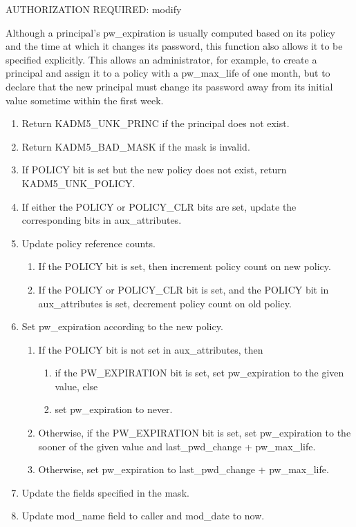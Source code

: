 AUTHORIZATION REQUIRED: modify

Although a principal's pw_expiration is usually computed based on its
policy and the time at which it changes its password, this function
also allows it to be specified explicitly.  This allows an
administrator, for example, to create a principal and assign it to a
policy with a pw_max_life of one month, but to declare that the new
principal must change its password away from its initial value
sometime within the first week.

\begin{enumerate}
\item Return KADM5_UNK_PRINC if the principal does not exist.
\item Return KADM5_BAD_MASK if the mask is invalid.
\item If POLICY bit is set but the new policy does not exist, return
KADM5_UNK_POLICY.
\item If either the POLICY or POLICY_CLR bits are set, update the
corresponding bits in aux_attributes.

\item Update policy reference counts.
\begin{enumerate}
\item If the POLICY bit is set, then increment policy count on new
policy.
\item If the POLICY or POLICY_CLR bit is set, and the POLICY bit in
aux_attributes is set, decrement policy count on old policy.
\end{enumerate}

\item Set pw_expiration according to the new policy.
\begin{enumerate}
\item If the POLICY bit is not set in aux_attributes, then
\begin{enumerate}
\item if the PW_EXPIRATION bit is set, set pw_expiration to the given
value, else
\item set pw_expiration to never.
\end{enumerate}
\item Otherwise, if the PW_EXPIRATION bit is set, set pw_expiration to
the sooner of the given value and last_pwd_change + pw_max_life.
\item Otherwise, set pw_expiration to last_pwd_change + pw_max_life.
\end{enumerate}

\item Update the fields specified in the mask.
\item Update mod_name field to caller and mod_date to now.
\end{enumerate}

